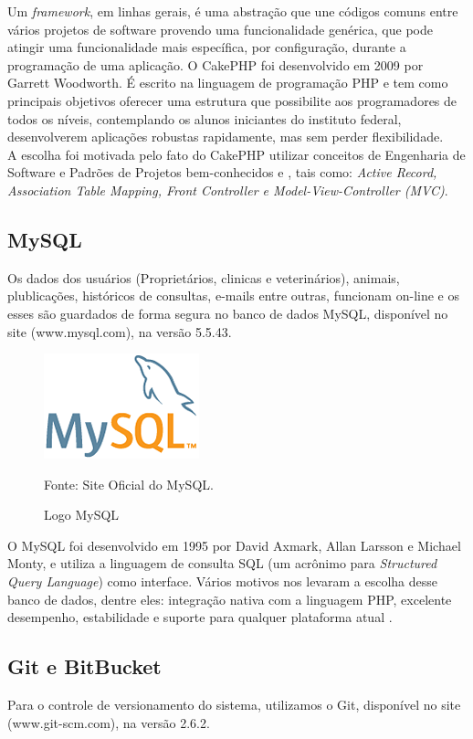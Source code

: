 Um {\it framework}, em linhas gerais, é uma abstração que une códigos comuns entre vários projetos de software provendo uma funcionalidade genérica, que pode atingir uma funcionalidade mais específica, por configuração, durante a programação de uma aplicação. O CakePHP foi desenvolvido em 2009 por Garrett Woodworth. É escrito na linguagem de programação PHP e tem como principais objetivos oferecer uma estrutura que possibilite aos programadores de todos os níveis, contemplando os alunos iniciantes do instituto federal, desenvolverem aplicações robustas rapidamente, mas sem perder flexibilidade.
\\
\indent
A escolha foi motivada pelo fato do CakePHP utilizar conceitos de Engenharia de Software e Padrões de Projetos bem-conhecidos
\cite{Gamma1994} e
\cite{Fowler2003}, tais como: {\it Active Record, Association Table Mapping, Front Controller e Model-View-Controller (MVC)}.

\subsection{MySQL}
Os dados dos usuários (Proprietários, clinicas e veterinários), animais, plublicações, históricos de consultas, e-mails entre outras, funcionam on-line e os esses são guardados de forma segura no banco de dados MySQL, disponível no site (www.mysql.com), na versão 5.5.43. 

\begin{figure}[!htb]
	\centering
	\includegraphics[scale=0.50
	]{imagens/logo-mysql}
	\caption{Logo MySQL}
	Fonte: Site Oficial do MySQL.
	\label{Rotulo}
\end{figure}

O MySQL foi desenvolvido em 1995 por David Axmark, Allan Larsson e Michael Monty, e utiliza a linguagem de consulta SQL (um acrônimo para {\it Structured Query Language}) como interface. Vários motivos nos levaram a escolha desse banco de dados, dentre eles: integração nativa com a linguagem PHP, excelente desempenho, estabilidade e suporte para qualquer plataforma atual \cite{Suehring2002}.


\subsection{Git e BitBucket}
Para o controle de versionamento do sistema, utilizamos o Git, disponível no site (www.git-scm.com), na versão 2.6.2. 

